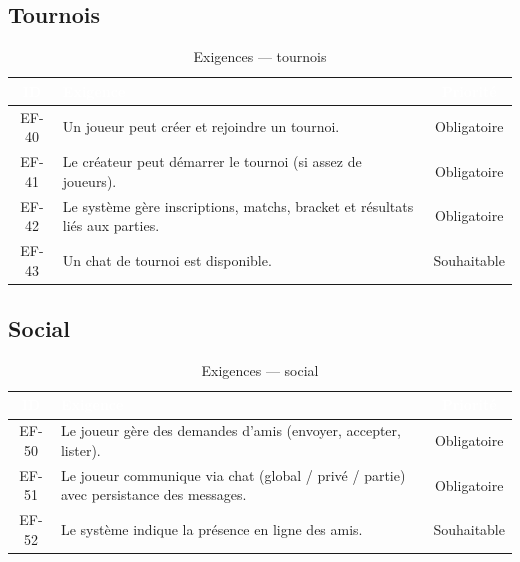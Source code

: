 \documentclass[12pt,a4paper,oneside]{article}
\begin{document}
\subsection{Tournois}
\begin{table}[H]
\centering
\caption{Exigences --- tournois}
\small
\begin{tabularx}{\linewidth}{|c|X|c|}
\hline
\rowcolor{sectionblue}
\textcolor{white}{\textbf{ID}} & \textcolor{white}{\textbf{Exigence}} & \textcolor{white}{\textbf{Priorité}} \\
\hline
EF-40 & Un joueur peut créer et rejoindre un tournoi. & Obligatoire \\
\hline
EF-41 & Le créateur peut démarrer le tournoi (si assez de joueurs). & Obligatoire \\
\hline
EF-42 & Le système gère inscriptions, matchs, bracket et résultats liés aux parties. & Obligatoire \\
\hline
EF-43 & Un chat de tournoi est disponible. & Souhaitable \\
\hline
\end{tabularx}
\end{table}

\subsection{Social}
\begin{table}[H]
\centering
\caption{Exigences --- social}
\small
\begin{tabularx}{\linewidth}{|c|X|c|}
\hline
\rowcolor{sectionblue}
\textcolor{white}{\textbf{ID}} & \textcolor{white}{\textbf{Exigence}} & \textcolor{white}{\textbf{Priorité}} \\
\hline
EF-50 & Le joueur gère des demandes d'amis (envoyer, accepter, lister). & Obligatoire \\
\hline
EF-51 & Le joueur communique via chat (global / privé / partie) avec persistance des messages. & Obligatoire \\
\hline
EF-52 & Le système indique la présence en ligne des amis. & Souhaitable \\
\hline
\end{tabularx}
\end{table}
\end{document}
